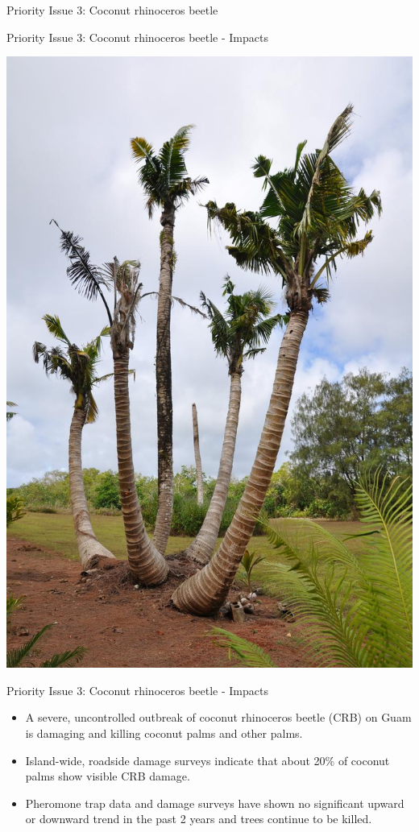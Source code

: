 \documentclass[]{beamer}
\begin{document}
\begin{frame}{Priority Issue 3: Coconut rhinoceros beetle}
\end{frame}

\begin{frame}{Priority Issue 3: Coconut rhinoceros beetle - Impacts}
	\begin{center}
		\includegraphics[height=\textheight]{images/dying_coconuts}
	\end{center}
\end{frame}

\begin{frame}{Priority Issue 3: Coconut rhinoceros beetle - Impacts}
	\begin{itemize}
		\item A severe, uncontrolled outbreak of coconut rhinoceros beetle (CRB) on Guam is damaging and killing coconut palms and other palms. \item Island-wide, roadside damage surveys indicate that about 20\% of coconut palms show visible CRB damage.
		\item  Pheromone trap data and damage surveys have shown no significant upward or downward trend in the past 2 years and trees continue to be killed.
	\end{itemize}
\end{frame}
\end{document}
